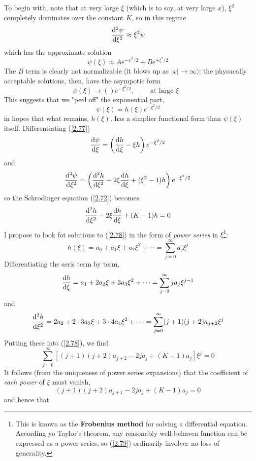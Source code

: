To begin with, note that at very large $\xi$ (which is to say, at very large $x$), $\xi^2$ completely dominates over the constant $K$, so in this regime
\begin{equation}\label{2.74}
	\dv[2]{\psi}{\xi}\approx \xi^2\psi
\end{equation}
which has the approximate solution
\begin{equation}\label{2.75}
	\psi(\xi)\approx Ae^{-\psi^2/2}+Be^{+\xi^2/2}
\end{equation}
The $B$ term is clearly not normalizable (it blows up as $|x|\to\infty)$; the physucally acceptable solutions, then, have the asympotic form
\begin{equation}\label{2.76}
	\psi(\xi)\to ()e^{-\xi^2/2},\qquad \mbox{ at large $\xi$ }
\end{equation}
This suggests that we "peel off" the exponential part,
\begin{equation}\label{2.77}
	\psi(\xi)=h(\xi)e^{-\xi^2/2}
\end{equation}
in hopes that what remains, $h(\xi)$, has a simplier functional form than $\psi(\xi)$ itself. Differentiating (\ref{2.77})
$$\dv{\psi}{\xi}=\left(\dv{h}{\xi}-\xi h\right)e^{-\xi^2/2}$$ and
$$\dv[2]{\psi}{\xi}=\left(\dv[2]{h}{\xi}-2\xi\dv{h}{\xi}+(\xi^2-1)h\right)e^{-\xi^2/2}$$
so the Schrodinger equation (\ref{2.72}) becomes
\begin{equation}\label{2.78}
	\dv[2]{h}{\xi}-2\xi\dv{h}{\xi}+(K-1)h=0
\end{equation}
I propose to look fot solutions to (\ref{2.78}) in the form of \textit{power series} in $\xi$\footnote{This is known as the \textbf{Frobenius method} for solving a differential equation. According yo Taylor's theorem, any reasonably well-behaven function can be expressed as a power series, so (\ref{2.79}) ordinarily involver no loss of generality.}:
\begin{equation}\label{2.79}
	h(\xi)=a_0+a_1\xi+a_2\xi^2+\cdots =\sum_{j=0}^\infty a_j\xi^j
\end{equation}
Differentiating the seris term by term, $$\dv{h}{\xi}=a_1+2a_2\xi+3a_3\xi^2+\cdots =\sum_{j=0}^\infty ja_j\xi^{j-1}$$
and $$\dv[2]{h}{\xi}=2a_2+2\cdot 3a_3\xi +3\cdot 4a_4\xi^2+\cdots =\sum_{j=0}^\infty (j+1)(j+2)a_{j+2}\xi^j$$
Putting these into (\ref{2.78}), we find
\begin{equation}\label{2.80}
	\sum_{j=0}^\infty [(j+1)(j+2)a_{j+2}-2ja_j+(K-1)a_j]\xi^j=0
\end{equation}
It follows (from the uniqueness of power series expansions) that the coefficient of \textit{each power} of $\xi$ must vanish, $$(j+1)(j+2)a_{j+1}-2ja_j+(K-1)a_j=0$$ and hence that
